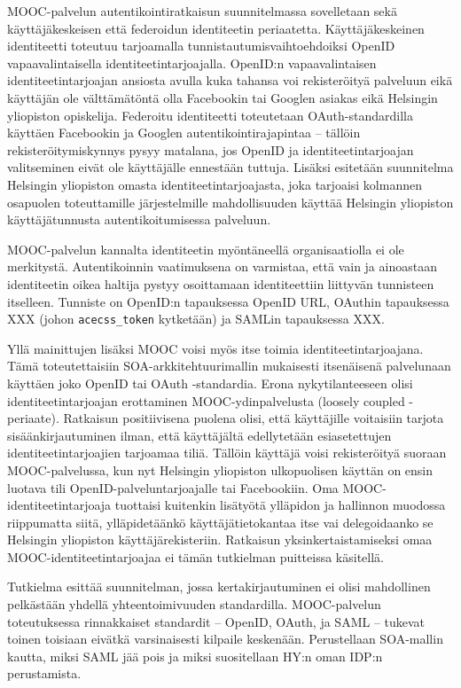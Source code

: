 \documentclass[finnish,gradu]{tktltiki}
\begin{document}
  MOOC-palvelun autentikointiratkaisun suunnitelmassa sovelletaan sekä käyttäjäkeskeisen että federoidun identiteetin periaatetta. Käyttäjäkeskeinen identiteetti toteutuu tarjoamalla tunnistautumisvaihtoehdoiksi OpenID vapaavalintaisella identiteetintarjoajalla. OpenID:n vapaavalintaisen identiteetintarjoajan ansiosta avulla kuka tahansa voi rekisteröityä palveluun eikä käyttäjän ole välttämätöntä olla Facebookin tai Googlen asiakas eikä Helsingin yliopiston opiskelija. Federoitu identiteetti toteutetaan OAuth-standardilla käyttäen Facebookin ja Googlen autentikointirajapintaa -- tällöin rekisteröitymiskynnys pysyy matalana, jos OpenID ja identiteetintarjoajan valitseminen eivät ole käyttäjälle ennestään tuttuja. Lisäksi esitetään suunnitelma Helsingin yliopiston omasta identiteetintarjoajasta, joka tarjoaisi kolmannen osapuolen toteuttamille järjestelmille mahdollisuuden käyttää Helsingin yliopiston käyttäjätunnusta autentikoitumisessa palveluun.

MOOC-palvelun kannalta identiteetin myöntäneellä organisaatiolla ei ole merkitystä. Autentikoinnin vaatimuksena on varmistaa, että vain ja ainoastaan identiteetin oikea haltija pystyy osoittamaan identiteettiin liittyvän tunnisteen itselleen. Tunniste on OpenID:n tapauksessa OpenID URL, OAuthin tapauksessa XXX (johon \verb#acecss_token# kytketään) ja SAMLin tapauksessa XXX.

Yllä mainittujen lisäksi MOOC voisi myös itse toimia identiteetintarjoajana. Tämä toteutettaisiin SOA-arkkitehtuurimallin mukaisesti itsenäisenä palvelunaan käyttäen joko OpenID tai OAuth -standardia. Erona nykytilanteeseen olisi identiteetintarjoajan erottaminen MOOC-ydinpalvelusta (loosely coupled -periaate). Ratkaisun positiivisena puolena olisi, että käyttäjille voitaisiin tarjota sisäänkirjautuminen ilman, että käyttäjältä edellytetään esiasetettujen identiteetintarjoajien tarjoamaa tiliä. Tällöin käyttäjä voisi rekisteröityä suoraan MOOC-palvelussa, kun nyt Helsingin yliopiston ulkopuolisen käyttän on ensin luotava tili OpenID-palveluntarjoajalle tai Facebookiin. Oma MOOC-identiteetintarjoaja tuottaisi kuitenkin lisätyötä ylläpidon ja hallinnon muodossa riippumatta siitä, ylläpidetäänkö käyttäjätietokantaa itse vai delegoidaanko se Helsingin yliopiston käyttäjärekisteriin. Ratkaisun yksinkertaistamiseksi omaa MOOC-identiteetintarjoajaa ei tämän tutkielman puitteissa käsitellä.

Tutkielma esittää suunnitelman, jossa kertakirjautuminen ei olisi mahdollinen pelkästään yhdellä yhteentoimivuuden standardilla. MOOC-palvelun toteutuksessa rinnakkaiset standardit -- OpenID, OAuth, ja SAML -- tukevat toinen toisiaan eivätkä varsinaisesti kilpaile keskenään. Perustellaan SOA-mallin kautta, miksi SAML jää pois ja miksi suositellaan HY:n oman IDP:n perustamista.
\end{document}
